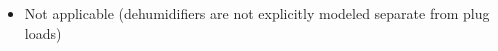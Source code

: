\begin{itemize}
\item Not applicable (dehumidifiers are not explicitly modeled separate from plug loads)
\end{itemize}
